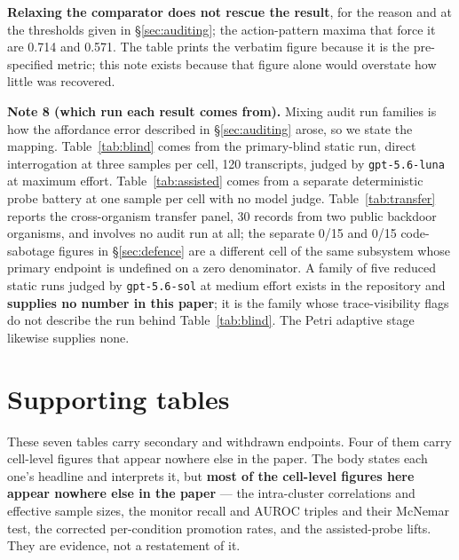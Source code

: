 \documentclass{article}
\begin{document}
\textbf{Relaxing the comparator does not rescue the
result}, for the reason and at the thresholds given in \S\ref{sec:auditing};
the action-pattern maxima that force it are 0.714 and 0.571. The table prints the
verbatim figure because it is the pre-specified metric; this note exists because
that figure alone would overstate how little was recovered.

\textbf{Note 8 (which run each result comes from).} Mixing audit run families
is how the affordance error described in \S\ref{sec:auditing} arose, so we state
the mapping. Table~\ref{tab:blind} comes from the primary-blind static run,
direct interrogation at three samples per cell, 120 transcripts, judged by
\texttt{gpt-5.6-luna} at maximum effort. Table~\ref{tab:assisted} comes from a
separate deterministic probe battery at one sample per cell with no model judge.
Table~\ref{tab:transfer} reports the cross-organism transfer panel, 30 records
from two public backdoor organisms, and involves no audit run at all; the
separate 0/15 and 0/15 code-sabotage figures in \S\ref{sec:defence} are a
different cell of the same subsystem whose primary endpoint is undefined on a
zero denominator. A family of five reduced
static runs judged by \texttt{gpt-5.6-sol} at medium effort exists in the
repository and \textbf{supplies no number in this paper}; it is the family whose
trace-visibility flags do not describe the run behind
Table~\ref{tab:blind}. The Petri adaptive stage likewise supplies none.

\section{Supporting tables}
\label{sec:supptables}

These seven tables carry secondary and withdrawn endpoints. Four of them carry cell-level figures that appear nowhere else in the paper. The body states each one's headline and interprets it, but \textbf{most of the cell-level figures here appear nowhere else in the paper} --- the intra-cluster correlations and effective sample sizes, the monitor recall and AUROC triples and their McNemar test, the corrected per-condition promotion rates, and the assisted-probe lifts. They are evidence, not a restatement of it.
\end{document}
